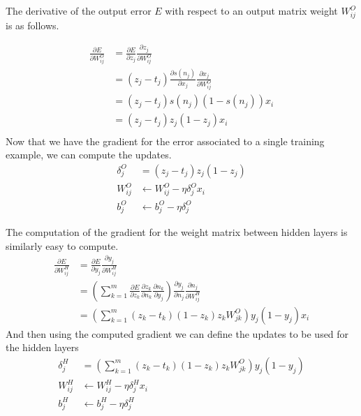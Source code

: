 The derivative of the output error $E$ with respect to an output matrix weight $W_{ij}^O$ is as follows.

\begin{equation}
\begin{split}
\frac{\partial E}{\partial W^O_{ij}} &= \frac{\partial E}{\partial z_j}\frac{\partial z_j}{\partial W^O_{ij}} \\
																	 &=(z_j - t_j)\frac{\partial s(n_j)}{\partial x_j}\frac{\partial x_j}{\partial W^O_{ij}} \\
																	 &=(z_j-t_j)s(n_j)(1-s(n_j))x_i \\
																	 &=(z_j-t_j)z_j(1-z_j)x_i \\
\end{split}
\label{}
\end{equation}
Now that we have the gradient for the error associated to a single training example, we can compute the updates.
\begin{equation}
\begin{split}
\delta^O_j &= (z_j-t_j)z_j(1-z_j) \\
W^O_{ij} &\leftarrow W^O_{ij} - \eta \delta^O_j x_i \\
b^O_j &\leftarrow b^O_j - \eta\delta^O_j
\end{split}
\end{equation}

The computation of the gradient for the weight matrix between hidden layers is similarly easy to compute.
\begin{equation}
\begin{split}
\frac{\partial E}{\partial W^H_{ij}} &= \frac{\partial E}{\partial y_j}\frac{\partial y_j}{\partial W^H_{ij}} \\
&=\left(\sum_{k=1}^m \frac{\partial E}{\partial z_k}\frac{\partial z_k}{\partial n_k}\frac{\partial n_k}{\partial y_j} \right)\frac{\partial y_j}{\partial n_j}\frac{\partial n_j}{\partial W_{ij}^H}\\
																	 &=\left(\sum_{k=1}^m (z_k - t_k)(1-z_k)z_kW_{jk}^O \right)y_j(1-y_j)x_i
\end{split}
\label{}
\end{equation}
And then using the computed gradient we can define the updates to be used for the hidden layers
\begin{equation}
\begin{split}
\delta^H_j &= \left(\sum_{k=1}^m (z_k - t_k)(1-z_k)z_kW_{jk}^O \right)y_j(1-y_j) \\
W^H_{ij} &\leftarrow W^H_{ij} - \eta\delta^H_jx_i \\
b^H_j &\leftarrow b^H_j - \eta\delta^H_j
\end{split}
\end{equation}

